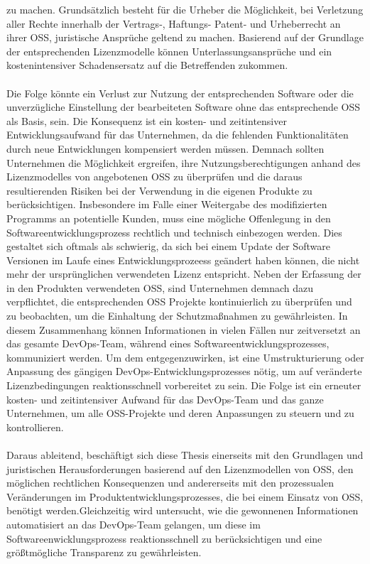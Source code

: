 zu machen. Grundsätzlich besteht für die Urheber die Möglichkeit, bei Verletzung aller Rechte innerhalb der Vertrags-, Haftungs- Patent- und Urheberrecht an ihrer OSS, juristische Ansprüche geltend zu machen. Basierend auf der Grundlage der entsprechenden Lizenzmodelle können Unterlassungsansprüche und ein kostenintensiver Schadensersatz auf die Betreffenden zukommen.\cite{helmreich_geschaftsrisiken_2012}\\\\ Die Folge könnte ein Verlust zur Nutzung der entsprechenden Software oder die unverzügliche Einstellung der bearbeiteten Software ohne das entsprechende OSS als Basis, sein. Die Konsequenz ist ein kosten- und zeitintensiver Entwicklungsaufwand für das Unternehmen, da die fehlenden Funktionalitäten durch neue Entwicklungen kompensiert werden müssen. Demnach sollten Unternehmen die Möglichkeit ergreifen, ihre Nutzungsberechtigungen anhand des Lizenzmodelles von angebotenen OSS zu überprüfen und die daraus resultierenden Risiken bei der Verwendung in die eigenen Produkte zu berücksichtigen. Insbesondere im Falle einer Weitergabe des modifizierten Programms an potentielle Kunden, muss eine mögliche Offenlegung in den Softwareentwicklungsprozess rechtlich und technisch einbezogen werden. Dies gestaltet sich oftmals als schwierig, da sich bei einem Update der Software Versionen im Laufe eines Entwicklungsprozeess geändert haben können, die nicht mehr der ursprünglichen verwendeten Lizenz entspricht. Neben der Erfassung der in den Produkten verwendeten OSS, sind Unternehmen demnach dazu verpflichtet, die entsprechenden OSS Projekte kontinuierlich zu überprüfen und zu beobachten, um die Einhaltung der Schutzmaßnahmen zu gewährleisten. In diesem Zusammenhang können Informationen in vielen Fällen nur zeitversetzt an das gesamte DevOps-Team, während eines Softwareentwicklungsprozesses, kommuniziert werden. Um dem entgegenzuwirken, ist eine Umstrukturierung oder Anpassung des gängigen DevOps-Entwicklungsprozesses nötig, um auf veränderte Lizenzbedingungen reaktionsschnell vorbereitet zu sein. Die Folge ist ein erneuter kosten- und zeitintensiver Aufwand für das DevOps-Team und das ganze Unternehmen, um alle OSS-Projekte und deren Anpassungen zu steuern und zu kontrollieren. \\\\Daraus ableitend, beschäftigt sich diese Thesis einerseits mit den Grundlagen und juristischen Herausforderungen basierend auf den Lizenzmodellen von OSS, den möglichen rechtlichen Konsequenzen und andererseits mit den prozessualen Veränderungen im Produktentwicklungsprozesses, die bei einem Einsatz von OSS, benötigt werden.Gleichzeitig wird untersucht, wie die gewonnenen Informationen automatisiert an das DevOps-Team gelangen, um diese im Softwareenwicklungsprozess reaktionsschnell zu berücksichtigen und eine größtmögliche Transparenz zu gewährleisten.  

